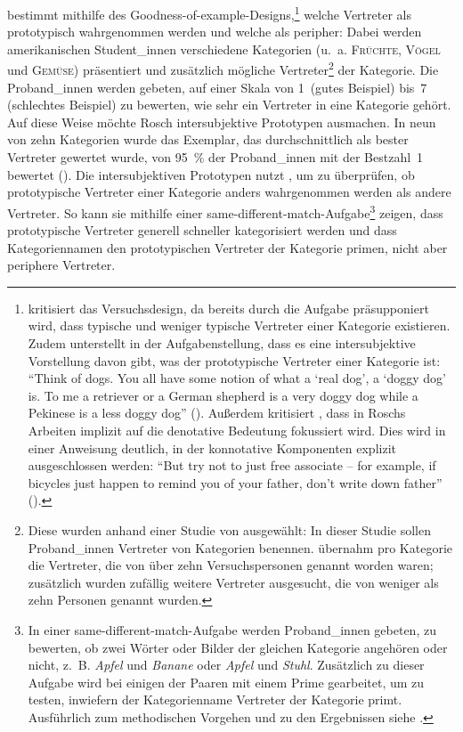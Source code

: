 \textcite[197--199]{Rosch.1975b} bestimmt mithilfe des Goodness-of-example-Designs,\footnote{\textcite[34--37]{Schmid.2000} kritisiert das Versuchsdesign, da bereits durch die Aufgabe präsupponiert wird, dass typische und weniger typische Vertreter einer Kategorie existieren. Zudem unterstellt \textcite[198]{Rosch.1975b} in der Aufgabenstellung, dass es eine intersubjektive Vorstellung davon gibt, was der prototypische Vertreter einer Kategorie ist: "`Think of dogs. You all have some notion of what a `real dog', a `doggy dog' is. To me a retriever or a German shepherd is a very doggy dog while a Pekinese is a less doggy dog"' (\cite[198]{Rosch.1975b}). Außerdem kritisiert \textcite[74]{Poitou.2004}, dass in Roschs Arbeiten implizit auf die denotative Bedeutung fokussiert wird. Dies wird in einer Anweisung deutlich, in der konnotative Komponenten explizit ausgeschlossen werden: "`But try not to just free associate -- for example, if bicycles just happen to remind you of your father, don't write down father"' (\cite[578]{Rosch.1975c}).} welche Vertreter als prototypisch wahrgenommen werden und welche als peripher: Dabei werden amerikanischen Student\_innen verschiedene Kategorien (u.~a. \textsc{Früchte}, \textsc{Vögel} und \textsc{Gemüse}) präsentiert und zusätzlich mögliche Vertreter\footnote{Diese wurden anhand einer Studie von \textcite{Battig.1969} ausgewählt: In dieser Studie sollen Proband\_innen Vertreter von Kategorien benennen. \textcite[197--199]{Rosch.1975b} übernahm pro Kategorie die Vertreter, die von über zehn Versuchspersonen genannt worden waren; zusätzlich wurden zufällig weitere Vertreter ausgesucht, die von weniger als zehn Personen genannt wurden.} der Kategorie. Die Proband\_innen werden gebeten, auf einer Skala von 1~(gutes Beispiel) bis~7 (schlechtes Beispiel) zu bewerten, wie sehr ein Vertreter in eine Kategorie gehört. Auf diese Weise möchte Rosch intersubjektive Prototypen ausmachen. In neun von zehn Kategorien wurde das Exemplar, das durchschnittlich als bester Vertreter gewertet wurde, von 95~\% der Proband\_innen mit der Bestzahl~1 bewertet (\cite[198]{Rosch.1975b}). Die intersubjektiven Prototypen nutzt \textcite[199--206]{Rosch.1975b}, um zu überprüfen, ob prototypische Vertreter einer Kategorie anders wahrgenommen werden als andere Vertreter. So kann sie mithilfe einer same-different-match-Aufgabe\footnote{In einer same-different-match-Aufgabe werden Proband\_innen gebeten, zu bewerten, ob zwei Wörter oder Bilder der gleichen Kategorie angehören oder nicht, z.~B. \textit{Apfel} und \textit{Banane} oder \textit{Apfel} und \textit{Stuhl}. Zusätzlich zu dieser Aufgabe wird bei einigen der Paaren mit einem Prime gearbeitet, um zu testen, inwiefern der Kategorienname Vertreter der Kategorie primt. Ausführlich zum methodischen Vorgehen und zu den Ergebnissen siehe \textcite{Rosch.1975b}.} zeigen, dass prototypische Vertreter generell schneller kategorisiert werden und dass Kategoriennamen den prototypischen Vertreter der Kategorie primen, nicht aber periphere Vertreter.\largerpage

